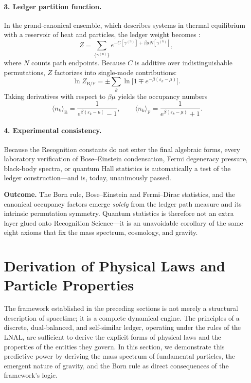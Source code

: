\paragraph{3.  Ledger partition function.}
In the grand-canonical ensemble, which describes systems in thermal equilibrium with a reservoir of heat and particles, the ledger weight becomes \parencite{Landau1980}:
\[
  Z=\!\!\sum_{\{\gamma^{(n)}\}}
       e^{-C[\gamma^{(n)}]+\beta\mu N[\gamma^{(n)}]},
\]
where $N$ counts path endpoints.  Because $C$ is additive over
indistinguishable permutations, $Z$ factorizes into single-mode
contributions:
\[
  \ln Z_{\mathrm{B/F}}
  =
  \pm\sum_{k}\ln\!\bigl[1\mp e^{-\beta(\varepsilon_{k}-\mu)}\bigr].
\]
Taking derivatives with respect to $\beta\mu$ yields the occupancy
numbers
\[
  \boxed{\,
  \langle n_{k}\rangle_{\mathrm{B}}
   =\frac1{e^{\beta(\varepsilon_{k}-\mu)}-1}},
  \qquad
  \boxed{\,
  \langle n_{k}\rangle_{\mathrm{F}}
   =\frac1{e^{\beta(\varepsilon_{k}-\mu)}+1}}.
\]

\paragraph{4.  Experimental consistency.}
Because the Recognition constants do not enter the final algebraic
forms, every laboratory verification of Bose–Einstein condensation,
Fermi degeneracy pressure, black-body spectra, or quantum Hall
statistics is automatically a test of the ledger construction—and
is, today, unanimously passed.

\bigskip\noindent
\textbf{Outcome.} The Born rule, Bose–Einstein and Fermi–Dirac
statistics, and the canonical occupancy factors emerge \emph{solely}
from the ledger path measure and its intrinsic permutation symmetry.
Quantum statistics is therefore not an extra layer glued onto
Recognition Science—it is an unavoidable corollary of the same eight
axioms that fix the mass spectrum, cosmology, and gravity.



\section{Derivation of Physical Laws and Particle Properties}

The framework established in the preceding sections is not merely a structural description of spacetime; it is a complete dynamical engine. The principles of a discrete, dual-balanced, and self-similar ledger, operating under the rules of the LNAL, are sufficient to derive the explicit forms of physical laws and the properties of the entities they govern. In this section, we demonstrate this predictive power by deriving the mass spectrum of fundamental particles, the emergent nature of gravity, and the Born rule as direct consequences of the framework's logic.

